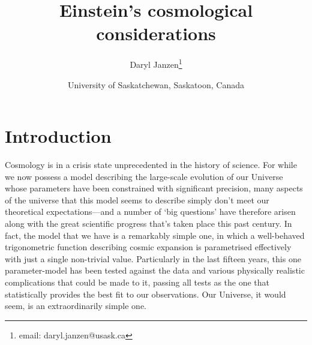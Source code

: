 \documentclass[12 pt]{article}
\begin{document}
%
\title{Einstein's cosmological considerations}
\author{Daryl Janzen\thanks{email: daryl.janzen@usask.ca}} 
\date{University of Saskatchewan, Saskatoon, Canada}
%
%
%
\maketitle
%

\section{Introduction}
\label{intro}

Cosmology is in a crisis state unprecedented in the history of science. For while we now possess a model describing the large-scale evolution of our Universe whose parameters have been constrained with significant precision, many aspects of the universe that this model seems to describe simply don't meet our theoretical expectations---and a number of `big questions' have therefore arisen along with the great scientific progress that's taken place this past century. In fact, the model that we have is a remarkably simple one, in which a well-behaved trigonometric function describing cosmic expansion is parametrised effectively with just a single non-trivial value. Particularly in the last fifteen years, this one parameter-model has been tested against the data and various physically realistic complications that could be made to it, passing all tests as the one that statistically provides the best fit to our observations. Our Universe, it would seem, is an extraordinarily simple one. 
\end{document}
